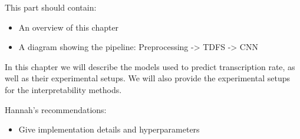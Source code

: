 
\glsresetall


This part should contain:
\begin{itemize}
  \item An overview of this chapter
  \item A diagram showing the pipeline: Preprocessing -> TDFS -> CNN
\end{itemize}

In this chapter we will describe the models used to predict transcription rate, as well as their experimental setups. We will also provide the experimental setups for the interpretability methods.

Hannah's recommendations:
\begin{itemize}
  \item Give implementation details and hyperparameters
\end{itemize}
